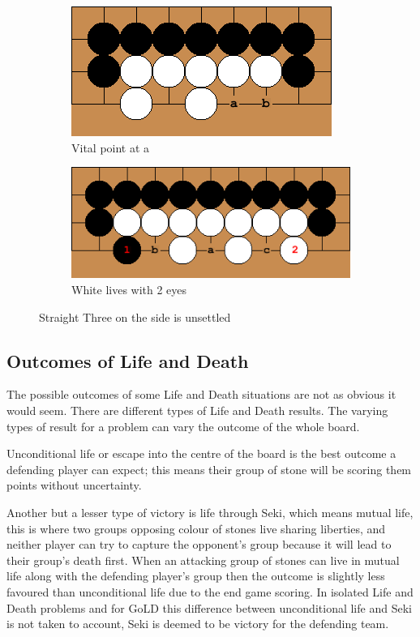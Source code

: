 \documentclass{l4proj}
\begin{document}
\begin{figure}[!ht]
\centering
\begin{subfigure}[b]{0.4\textwidth}
\includegraphics[width=\textwidth]{LD/5a.png}
\caption{Vital point at a}
\label{fig:LD-5a}
\end{subfigure}\qquad
\begin{subfigure}[b]{0.5\textwidth}
\includegraphics[width=\textwidth]{LD/5b.png}
\caption{White lives with 2 eyes}
\label{fig:LD-5b}
\end{subfigure}
\caption{Straight Three on the side is unsettled}
\label{fig:LD-5}
\end{figure}


\subsection{Outcomes of Life and Death}
The possible outcomes of some Life and Death situations are not as obvious it would seem. There are different types of Life and Death results. The varying types of result for a problem can vary the outcome of the whole board.

Unconditional life or escape into the centre of the board is the best outcome a defending player can expect; this means their group of stone will be scoring them points without uncertainty.

Another but a lesser type of victory is life through Seki, which means mutual life, this is where two groups opposing colour of stones live sharing liberties, and neither player can try to capture the opponent’s group because it will lead to their group’s death first. When an attacking group of stones can live in mutual life along with the defending player’s group then the outcome is slightly less favoured than unconditional life due to the end game scoring. In isolated Life and Death problems and for GoLD this difference between unconditional life and Seki is not taken to account, Seki is deemed to be victory for the defending team.
\end{document}
